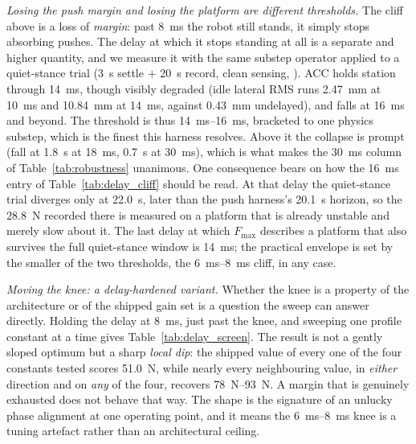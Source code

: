 \documentclass[conference]{IEEEtran}
\begin{document}
\emph{Losing the push margin and losing the platform are different thresholds.}
The cliff above is a loss of \emph{margin}: past \SI{8}{ms} the robot still stands, it simply stops absorbing pushes. The delay at which it stops standing at all is a separate and higher quantity, and we measure it with the same substep operator applied to a quiet-stance trial (\SI{3}{s} settle $+$ \SI{20}{s} record, clean sensing, ). ACC holds station through \SI{14}{ms}, though visibly degraded (idle lateral RMS runs \SI{2.47}{mm} at \SI{10}{ms} and \SI{10.84}{mm} at \SI{14}{ms}, against \SI{0.43}{mm} undelayed), and falls at \SI{16}{ms} and beyond. The threshold is thus \SIrange{14}{16}{ms}, bracketed to one physics substep, which is the finest this harness resolves. Above it the collapse is prompt (fall at \SI{1.8}{s} at \SI{18}{ms}, \SI{0.7}{s} at \SI{30}{ms}), which is what makes the \SI{30}{ms} column of Table~\ref{tab:robustness} unanimous.
One consequence bears on how the \SI{16}{ms} entry of Table~\ref{tab:delay_cliff} should be read. At that delay the quiet-stance trial diverges only at \SI{22.0}{s}, later than the push harness's \SI{20.1}{s} horizon, so the \SI{28.8}{N} recorded there is measured on a platform that is already unstable and merely slow about it. The last delay at which $F_{\max}$ describes a platform that also survives the full quiet-stance window is \SI{14}{ms}; the practical envelope is set by the smaller of the two thresholds, the \SIrange{6}{8}{ms} cliff, in any case.

\emph{Moving the knee: a delay-hardened variant.}
Whether the knee is a property of the architecture or of the shipped gain set is a question the sweep can answer directly. Holding the delay at \SI{8}{ms}, just past the knee, and sweeping one profile constant at a time gives Table~\ref{tab:delay_screen}. The result is not a gently sloped optimum but a sharp \emph{local dip}: the shipped value of every one of the four constants tested scores \SI{51.0}{N}, while nearly every neighbouring value, in \emph{either} direction and on \emph{any} of the four, recovers \SIrange{78}{93}{N}. A margin that is genuinely exhausted does not behave that way. The shape is the signature of an unlucky phase alignment at one operating point, and it means the \SIrange{6}{8}{ms} knee is a tuning artefact rather than an architectural ceiling.
\end{document}
